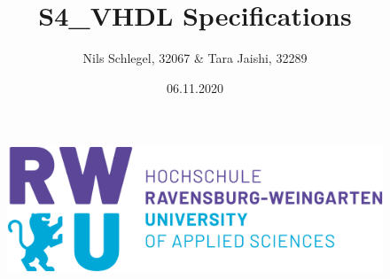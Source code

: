 \documentclass[12pt,a4 paper] {article}
\title{S4\_VHDL Specifications}
\author{Nils Schlegel, 32067 & Tara Jaishi, 32289}
\date{06.11.2020}
\begin{document}
	\maketitle

\begin{figure}[h]
	\centering
	\includegraphics[scale=0.4]{../png/rwu.png}
	
\end{figure}
\newpage
\end{document}
